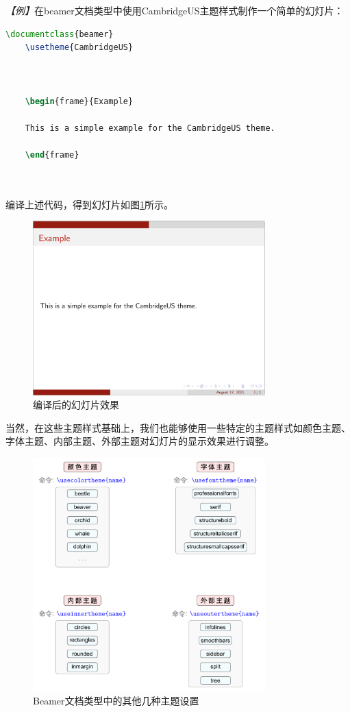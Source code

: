 \emph{【例】}在beamer文档类型中使用CambridgeUS主题样式制作一个简单的幻灯片：
\begin{lstlisting}[language=TeX]
    \documentclass{beamer}
    \usetheme{CambridgeUS}
    
    
    
    \begin{frame}{Example}
    
    This is a simple example for the CambridgeUS theme.
    
    \end{frame}
    
    
\end{lstlisting}

编译上述代码，得到幻灯片如图\ref{fig:925}所示。

\begin{figure}[htbp]
    \centering
    \includegraphics[width = 0.8\textwidth]{images/ch_9/example_sec2_1.png}
    \caption{编译后的幻灯片效果}
    \label{fig:925}
\end{figure}

当然，在这些主题样式基础上，我们也能够使用一些特定的主题样式如颜色主题、字体主题、内部主题、外部主题对幻灯片的显示效果进行调整。

\begin{figure}[htbp]
    \centering
    \includegraphics[width = 0.8\textwidth]{images/ch_9/other_themes.pdf}
    \caption{Beamer文档类型中的其他几种主题设置}
    \label{fig:926}
\end{figure}

